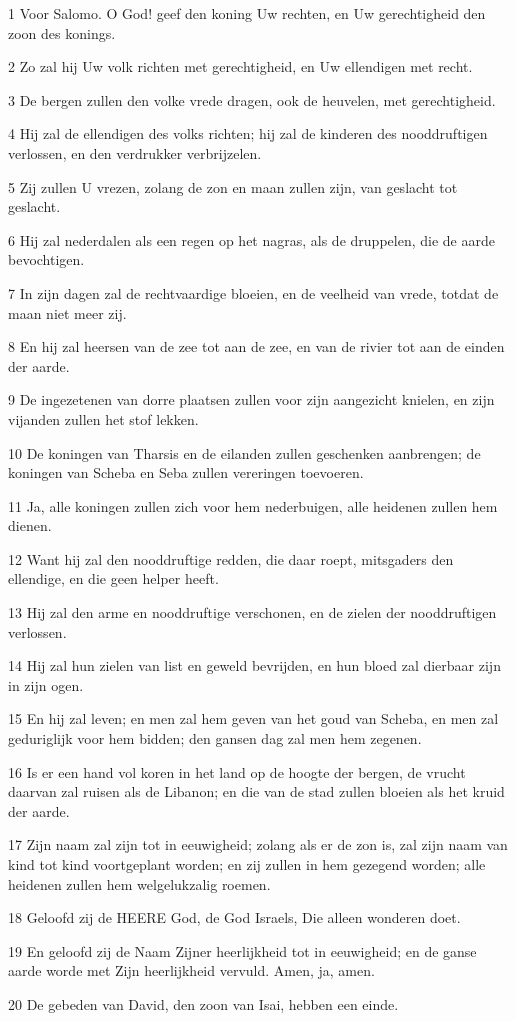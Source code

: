 \par 1 Voor Salomo. O God! geef den koning Uw rechten, en Uw gerechtigheid den zoon des konings.
\par 2 Zo zal hij Uw volk richten met gerechtigheid, en Uw ellendigen met recht.
\par 3 De bergen zullen den volke vrede dragen, ook de heuvelen, met gerechtigheid.
\par 4 Hij zal de ellendigen des volks richten; hij zal de kinderen des nooddruftigen verlossen, en den verdrukker verbrijzelen.
\par 5 Zij zullen U vrezen, zolang de zon en maan zullen zijn, van geslacht tot geslacht.
\par 6 Hij zal nederdalen als een regen op het nagras, als de druppelen, die de aarde bevochtigen.
\par 7 In zijn dagen zal de rechtvaardige bloeien, en de veelheid van vrede, totdat de maan niet meer zij.
\par 8 En hij zal heersen van de zee tot aan de zee, en van de rivier tot aan de einden der aarde.
\par 9 De ingezetenen van dorre plaatsen zullen voor zijn aangezicht knielen, en zijn vijanden zullen het stof lekken.
\par 10 De koningen van Tharsis en de eilanden zullen geschenken aanbrengen; de koningen van Scheba en Seba zullen vereringen toevoeren.
\par 11 Ja, alle koningen zullen zich voor hem nederbuigen, alle heidenen zullen hem dienen.
\par 12 Want hij zal den nooddruftige redden, die daar roept, mitsgaders den ellendige, en die geen helper heeft.
\par 13 Hij zal den arme en nooddruftige verschonen, en de zielen der nooddruftigen verlossen.
\par 14 Hij zal hun zielen van list en geweld bevrijden, en hun bloed zal dierbaar zijn in zijn ogen.
\par 15 En hij zal leven; en men zal hem geven van het goud van Scheba, en men zal geduriglijk voor hem bidden; den gansen dag zal men hem zegenen.
\par 16 Is er een hand vol koren in het land op de hoogte der bergen, de vrucht daarvan zal ruisen als de Libanon; en die van de stad zullen bloeien als het kruid der aarde.
\par 17 Zijn naam zal zijn tot in eeuwigheid; zolang als er de zon is, zal zijn naam van kind tot kind voortgeplant worden; en zij zullen in hem gezegend worden; alle heidenen zullen hem welgelukzalig roemen.
\par 18 Geloofd zij de HEERE God, de God Israels, Die alleen wonderen doet.
\par 19 En geloofd zij de Naam Zijner heerlijkheid tot in eeuwigheid; en de ganse aarde worde met Zijn heerlijkheid vervuld. Amen, ja, amen.
\par 20 De gebeden van David, den zoon van Isai, hebben een einde.


